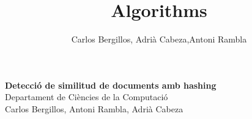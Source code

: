 \documentclass[12pt]{article}
\author{Carlos Bergillos, Adrià Cabeza,Antoni Rambla}
\title{Algorithms}
\begin{document}
\begin{titlepage}
   \begin{center}
      \Large\textbf{Detecció de similitud de documents amb hashing }\\
      \large Departament de Ciències de la Computació\\
      Carlos Bergillos, Antoni Rambla, Adrià Cabeza
   \end{center}
\end{titlepage}


\newpage
\end{document}
